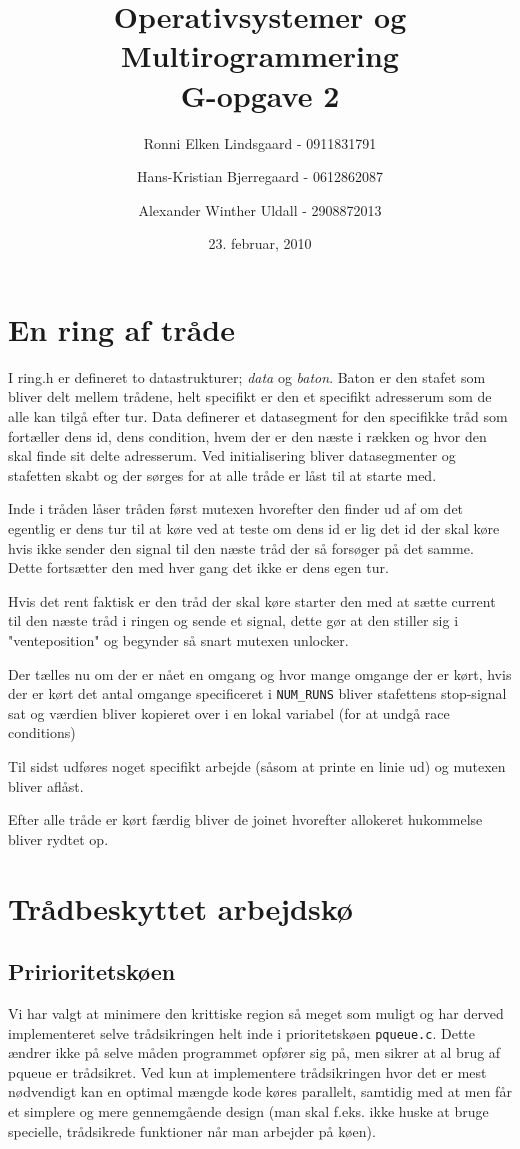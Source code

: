 \documentclass[titlepage]{article}
\title{Operativsystemer og Multirogrammering \\G-opgave 2}
\author{Ronni Elken Lindsgaard - 0911831791 \and
Hans-Kristian Bjerregaard - 0612862087 \and
Alexander Winther Uldall - 2908872013}
\date{23. februar, 2010}
\begin{document}
\maketitle
\newpage
\section{En ring af tråde}
I ring.h er defineret to datastrukturer; {\it data} og {\it baton}. Baton er den stafet som bliver delt mellem trådene, helt specifikt er den et specifikt adresserum som de alle kan tilgå efter tur.
Data definerer et datasegment for den specifikke tråd som fortæller dens id, dens condition, hvem der er den næste i rækken og hvor den skal finde sit delte adresserum.
Ved initialisering bliver datasegmenter og stafetten skabt og der sørges for at alle tråde er låst til at starte med.

Inde i tråden låser tråden først mutexen hvorefter den finder ud af om det egentlig er dens tur til at køre ved at teste om dens id er lig det id der skal køre hvis ikke sender den signal til den næste tråd der så forsøger på det samme. Dette fortsætter den med hver gang det ikke er dens egen tur.

Hvis det rent faktisk er den tråd der skal køre starter den med at sætte current til den næste tråd i ringen og sende et signal, dette gør at den stiller sig i "venteposition" og begynder så snart mutexen unlocker.

Der tælles nu om der er nået en omgang og hvor mange omgange der er kørt, hvis der er kørt det antal omgange specificeret i {\tt NUM\_RUNS} bliver stafettens stop-signal sat og værdien bliver kopieret over i en lokal variabel (for at undgå race conditions)

Til sidst udføres noget specifikt arbejde (såsom at printe en linie ud) og mutexen bliver aflåst.

Efter alle tråde er kørt færdig bliver de joinet hvorefter allokeret hukommelse bliver rydtet op.

\section{Trådbeskyttet arbejdskø}
  \subsection{Pririoritetskøen}
    Vi har valgt at minimere den krittiske region så meget som muligt og har derved implementeret selve trådsikringen helt inde i prioritetskøen {\tt pqueue.c}.
    Dette ændrer ikke på selve måden programmet opfører sig på, men sikrer at al brug af pqueue er trådsikret.
    Ved kun at implementere trådsikringen hvor det er mest nødvendigt kan en optimal mængde kode køres parallelt, samtidig med at men får et simplere og mere gennemgående design (man skal f.eks. ikke huske at bruge specielle, trådsikrede funktioner når man arbejder på køen).
\end{document}
